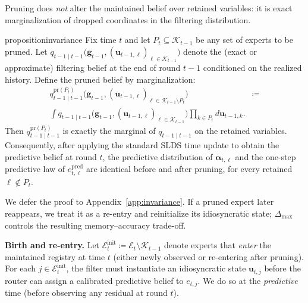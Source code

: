 Pruning does \emph{not} alter the maintained belief over retained variables: it is exact
marginalization of dropped coordinates in the filtering distribution.

\begin{restatable}{proposition}{invariance}
\label{prop:invariance}
Fix time \(t\) and let \(P_t \subseteq \mathcal{K}_{t-1}\) be any set of experts to be pruned.
Let
\(
q_{t-1\mid t-1}\big(\mathbf{g}_{t-1},(\mathbf{u}_{t-1,\ell})_{\ell\in\mathcal{K}_{t-1}}\big)
\)
denote the (exact or approximate) filtering belief at the end of round \(t-1\) conditioned on the realized history.
Define the pruned belief by marginalization:
\begin{equation*}
    \begin{aligned}
        q^{\mathrm{pr}(P_t)}_{t-1\mid t-1}\big(\mathbf{g}_{t-1},(\mathbf{u}_{t-1,\ell})_{\ell\in\mathcal{K}_{t-1}\setminus P_t}\big)
& \coloneqq \\
\int q_{t-1\mid t-1}\big(\mathbf{g}_{t-1},(\mathbf{u}_{t-1,\ell})_{\ell\in\mathcal{K}_{t-1}}\big)
\prod_{k\in P_t} d\mathbf{u}_{t-1,k}.
    \end{aligned}
\end{equation*}
Then \(q^{\mathrm{pr}(P_t)}_{t-1\mid t-1}\) is exactly the marginal of \(q_{t-1\mid t-1}\) on the retained variables.
Consequently, after applying the standard SLDS time update to obtain the predictive belief at round \(t\),
the predictive distribution of \(\boldsymbol\alpha_{t,\ell}\) and the one-step predictive law of
\(e_{t,\ell}^{\mathrm{pred}}\) are identical before and after pruning, for every retained \(\ell\notin P_t\).
\end{restatable}

We defer the proof to Appendix~\ref{app:invariance}. If a pruned expert later reappears, we treat it
as a re-entry and reinitialize its idiosyncratic state; \(\Delta_{\max}\) controls the resulting
memory--accuracy trade-off.

\textbf{Birth and re-entry.}
Let
\(\mathcal{E}^{\mathrm{init}}_t\coloneqq \mathcal{E}_t\setminus \mathcal{K}_{t-1}\)
denote experts that \emph{enter} the maintained registry at time \(t\) (either newly observed or
re-entering after pruning). For each \(j\in\mathcal{E}^{\mathrm{init}}_t\), the filter must
instantiate an idiosyncratic state \(\mathbf{u}_{t,j}\) before the router can assign a calibrated
predictive belief to \(e_{t,j}\). We do so at the \emph{predictive} time (before observing any
residual at round \(t\)).

